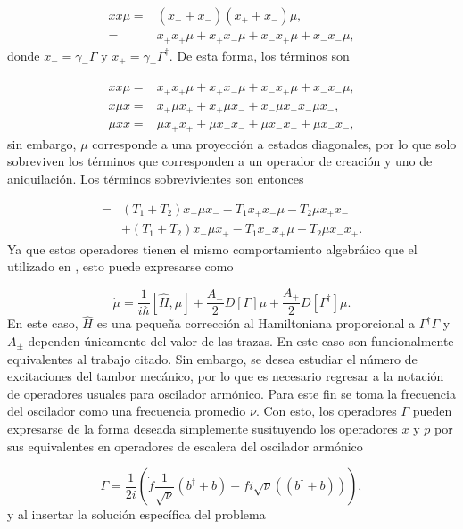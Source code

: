 \documentclass[a4paper,10pt]{report}
\begin{document}
\begin{align*}
xx\mu=& (x_++x_-)(x_++x_-)\mu,\\
=&x_+x_+\mu + x_+x_-\mu + x_-x_+\mu + x_-x_-\mu, 
\end{align*} donde $x_- = \gamma_- \Gamma$ y $x_+ = \gamma_+ \Gamma^{\dagger}$. De esta forma, los términos son

\begin{align}
xx\mu=&x_+x_+\mu + x_+x_-\mu + x_-x_+\mu + x_-x_-\mu,\\
x\mu x=&x_+\mu x_+ + x_+\mu x_- + x_-\mu x_+ x_-\mu x_-,\\
\mu xx=& \mu x_+x_+ + \mu x_+x_-+ \mu x_-x_+ +\mu x_-x_-,
\end{align} sin embargo, $\mu$ corresponde a una proyección a estados diagonales, por lo que solo sobreviven los términos que corresponden a un operador de creación y uno de aniquilación. Los términos sobrevivientes son entonces

\begin{align}
=&(T_1+T_2)x_+\mu x_- -T_1 x_+x_-\mu - T_2\mu x_+x_- \\ 
&+ \nonumber (T_1+T_2)x_-\mu x_+  -T_1 x_-x_+\mu -T_2 \mu x_-x_+.
\end{align} Ya que estos operadores tienen el mismo comportamiento algebráico que el utilizado en \cite{BarberisLC}, esto puede expresarse como

\begin{equation}
\dot{\mu} = \frac{1}{i\hbar}[\hat{H},\mu] + \frac{A_-}{2}D[\Gamma]\mu + \frac{A_+}{2}D[\Gamma^\dagger]\mu.
\end{equation} En este caso, $\hat{H}$ es una pequeña corrección al Hamiltoniana proporcional a $\Gamma^\dagger \Gamma$ y $A_\pm$ dependen únicamente del valor de las trazas. En este caso son funcionalmente equivalentes al trabajo citado. Sin embargo, se desea estudiar el número de excitaciones del tambor mecánico, por lo que es necesario regresar a la notación de operadores usuales para oscilador armónico. Para este fin se toma la frecuencia del oscilador como una frecuencia promedio $\nu$. Con esto, los operadores $\Gamma$ pueden expresarse de la forma deseada simplemente susituyendo los operadores $x$ y $p$ por sus equivalentes en operadores de escalera del oscilador armónico

\begin{equation}
\Gamma = \frac{1}{2i}(\dot{f} \frac{1}{\sqrt{\nu}} (b^\dagger + b) - fi\sqrt{\nu}((b^\dagger + b))),
\end{equation} y al insertar la solución específica del problema
\end{document}
